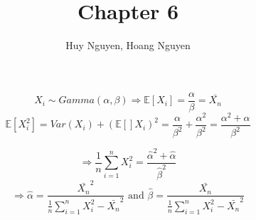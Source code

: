 \documentclass[10pt]{article}
\newenvironment{problem}[2][Problem]{\begin{trivlist}
\item[\hskip \labelsep {\bfseries #1}\hskip \labelsep {\bfseries #2.}]}{\end{trivlist}}
\begin{document}
\title{Chapter 6}
\author{Huy Nguyen, Hoang Nguyen}
\maketitle
    
\begin{problem}{1}



\[ X_i \sim Gamma(\alpha, \beta) \Rightarrow \mathbb{E}[X_i]=\frac{\alpha}{\beta}=\bar{X_n}\]
\[\mathbb{E}[X_i^2]=Var(X_i)+ (\mathbb{E}[]X_i)^2=\frac{\alpha}{\beta ^2}+ \frac{\alpha ^2}{\beta ^2}= \frac{\alpha ^2 + \alpha}{\beta ^2} \]

\[\Rightarrow \frac{1}{n} \sum_{i=1}^{n} X_i ^2= \frac{\hat{\alpha} ^2 + \hat{\alpha}}{\hat{\beta} ^2}\]
\[\Rightarrow \hat{\alpha} =\frac{\bar{X_n}^2}{\frac{1}{n} \sum_{i=1}^{n} X_i ^2 -\bar{X_n}^2}
 \text{ and } \hat{\beta}=\frac{\bar{X_n}}{\frac{1}{n} \sum_{i=1}^{n} X_i ^2 -\bar{X_n}^2}\]
\end{problem}
\end{document}
